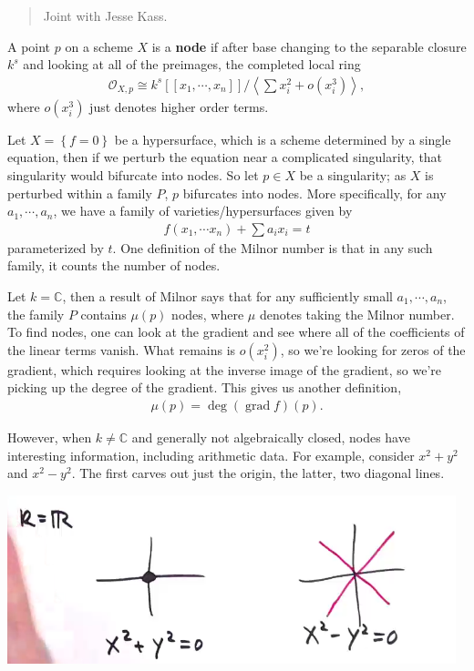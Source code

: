 \begin{quote}
Joint with Jesse Kass.
\end{quote}

\begin{definition}[Nodes]

A point \(p\) on a scheme \(X\) is a \textbf{node} if after base
changing to the separable closure \(k^s\) and looking at all of the
preimages, the completed local ring
\begin{align*}
{\mathcal{O}}_{X, p} \cong k^s[[x_1, \cdots, x_n]] / \left\langle{\sum x_i^2 + o(x_i^3)}\right\rangle
,\end{align*}
where \(o(x_i^3)\) just denotes higher order terms.

\end{definition}

Let \(X = \left\{{f=0}\right\}\) be a hypersurface, which is a scheme
determined by a single equation, then if we perturb the equation near a
complicated singularity, that singularity would bifurcate into nodes. So
let \(p\in X\) be a singularity; as \(X\) is perturbed within a family
\(P\), \(p\) bifurcates into nodes. More specifically, for any
\(a_1, \cdots, a_n\), we have a family of varieties/hypersurfaces given
by
\begin{align*}
f(x_1, \cdots x_n) + \sum a_i x_i = t
\end{align*}
parameterized by \(t\). One definition of the Milnor number is that in
any such family, it counts the number of nodes.

Let \(k={\mathbb{C}}\), then a result of Milnor says that for any
sufficiently small \(a_1, \cdots, a_n\), the family \(P\) contains
\(\mu(p)\) nodes, where \(\mu\) denotes taking the Milnor number. To
find nodes, one can look at the gradient and see where all of the
coefficients of the linear terms vanish. What remains is \(o(x_i^2)\),
so we're looking for zeros of the gradient, which requires looking at
the inverse image of the gradient, so we're picking up the degree of the
gradient. This gives us another definition,
\begin{align*}
\mu(p) = \deg(\operatorname{grad}f)(p)
.\end{align*}

However, when \(k\neq {\mathbb{C}}\) and generally not algebraically
closed, nodes have interesting information, including arithmetic data.
For example, consider \(x^2+y^2\) and \(x^2-y^2\). The first carves out
just the origin, the latter, two diagonal lines.

\includegraphics{assets/2019-03-09-12-18-52.png}\\

